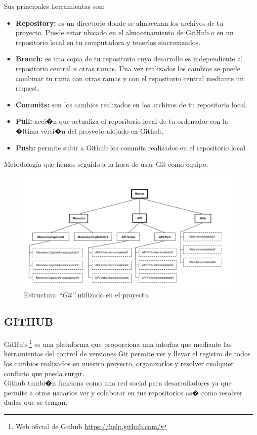 Sus principales herramientas son:

\begin{itemize}
	
	\item \textbf{Repository:} es un directorio donde se almacenan los archivos de tu proyecto. Puede estar ubicado en el almacenamiento de GitHub o en un repositorio local en tu computadora y tenerlos sincronizados.
	
	
	\item \textbf{Branch:} es una copia de tu repositorio cuyo desarrollo es independiente al repositorio central u otras ramas. Una vez realizados los cambios se puede combinar tu rama con otras ramas y con el repositorio central mediante un request.
	 
	
	\item \textbf{Commits:} son los cambios realizados en los archivos de tu repositorio local.

	\item \textbf{Pull:} acci�n que actualiza el repositorio local de tu ordenador con la �ltima versi�n del proyecto alojado en Github.
	
	\item \textbf{Push:} permite subir a Github los commits realizados en el repositorio local.	
	
\end{itemize}

Metodología que hemos seguido a la hora de usar Git como equipo:
\begin{figure}[]
	\centering
	\includegraphics[width=1\textwidth]{Imagenes/Fuentes/Metodologias/Arbol git.png}
	\caption{Estructura \textit{``Git''} utilizado en el proyecto.  }
	\label {fig: imgGit}
\end{figure}


\subsection{GITHUB}
GitHub \footnote{Web oficial de Github \url{https://help.github.com/}} es una plataforma que proporciona una interfaz que mediante las herramientas del control de versiones Git permite ver y llevar el registro de todos los cambios realizados en nuestro proyecto, organizarlos y resolver cualquier conflicto que pueda surgir. \\

Github tambi�n funciona como una red social para desarrolladores ya que permite a otros usuarios ver y colaborar en tus repositorios as� como resolver dudas que se tengan.





